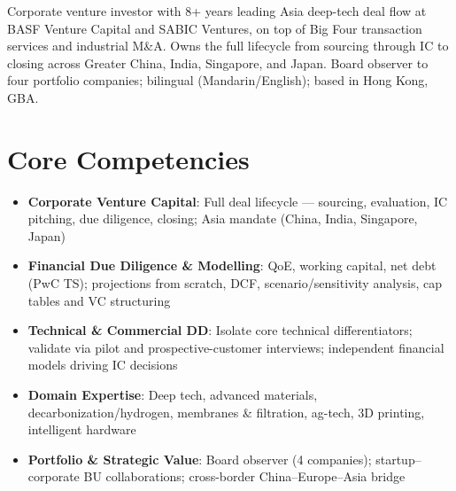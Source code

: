 \documentclass[11pt,a4paper,sans]{moderncv}
\begin{document}
\makecvtitle

\vspace{6pt}
\small{Corporate venture investor with 8+ years leading Asia deep-tech deal flow at BASF Venture Capital and SABIC Ventures, on top of Big Four transaction services and industrial M\&A. Owns the full lifecycle from sourcing through IC to closing across Greater China, India, Singapore, and Japan. Board observer to four portfolio companies; bilingual (Mandarin/English); based in Hong Kong, GBA.}

\section{Core Competencies}
\vspace{1pt}
\begin{itemize}

\item \textbf{Corporate Venture Capital}: Full deal lifecycle --- sourcing, evaluation, IC pitching, due diligence, closing; Asia mandate (China, India, Singapore, Japan)

\item \textbf{Financial Due Diligence \& Modelling}: QoE, working capital, net debt (PwC TS); projections from scratch, DCF, scenario/sensitivity analysis, cap tables and VC structuring

\item \textbf{Technical \& Commercial DD}: Isolate core technical differentiators; validate via pilot and prospective-customer interviews; independent financial models driving IC decisions

\item \textbf{Domain Expertise}: Deep tech, advanced materials, decarbonization/hydrogen, membranes \& filtration, ag-tech, 3D printing, intelligent hardware

\item \textbf{Portfolio \& Strategic Value}: Board observer (4 companies); startup--corporate BU collaborations; cross-border China--Europe--Asia bridge

\end{itemize}
\end{document}
